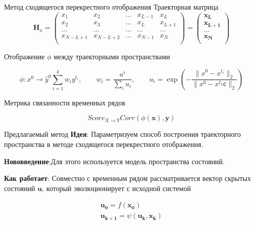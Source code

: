 \documentclass{beamer}
\begin{document}
	\begin{frame}{Метод сходящегося перекрестного отображения}
		Траекторная матрица
		$$
		\mathbf{H}_{x} =
		\left( {\begin{array}{ccccc}
				x_1 & x_2 & ... & x_{L-1} & x_L\\
				x_2 & x_3 & ... & x_{L} & x_{L +1}\\
				... & ... & ... & ...   & ... \\
				x_{N-L+1} & x_{N-L +2} & ... & x_{N-1} & x_N\\
		\end{array} } \right) = 
		\left( {\begin{array}{c}
				\mathbf{x_L}\\
				\mathbf{x_{L + 1}}\\
				...         \\
				\mathbf{x_N}\\
		\end{array} } \right)
		$$
		
		Отображение $\phi$  между траекторными пространствами
		
		$$
		\phi: x^0 \rightarrow \hat y^0 \sum^k_{i = 1} w_iy^{t_i}, \qquad w_i = \frac{u^i}{\sum_i u_i}, \qquad u_i = \exp(-\frac{\|x^0 - x^{t_i}\|_2}{\|x^0 - x^{t_k}с\|_2})
		$$
		
		Метрика связанности временных рядов
		
		$$
		Score_{X\rightarrow Y} Corr(\phi(\mathbf{x}), \mathbf{y})
		$$
	\end{frame}
	
	
	\begin{frame}{Предлагаемый метод}
		\textbf{Идея}: Параметризуем способ построения траекторного пространства в методе сходящегося перекрестного отображения.
		
		\textbf{Нововведение}:Для этого используется модель пространства состояний.
		
		\textbf{Как работает}:  Совместно с временным рядом рассматривается вектор скрытых состояний $\mathbf{u}$, который эволюционирует с исходной системой
		
			$$
			\begin{split}
				\mathbf{u_0} = f(\mathbf{x_0}) \\ 
				\mathbf{u_{k + 1}} = \psi(\mathbf{u_k}, \mathbf{x_k}) 
			\end{split}
			$$
		
	\end{frame}
	
\end{document}
